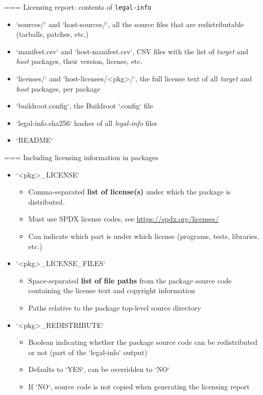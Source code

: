 === {Licensing report: contents of {\tt legal-info}}
  \begin{itemize}
  \item `sources/` and `host-sources/`, all the source files
    that are redistributable (tarballs, patches, etc.)
  \item `manifest.csv` and `host-manifest.csv`, CSV files
    with the list of {\em target} and {\em host} packages, their
    version, license, etc.
  \item `licenses/` and `host-licenses/<pkg>/`, the full license text of all {\em
      target} and {\em host} packages, per package
  \item `buildroot.config`, the Buildroot `.config` file
  \item `legal-info.sha256` hashes of all {\em legal-info} files
  \item `README`
  \end{itemize}


=== {Including licensing information in packages}
  \begin{itemize}
  \item `<pkg>_LICENSE`
    \begin{itemize}
    \item Comma-separated {\bf list of license(s)} under which the
      package is distributed.
    \item Must use SPDX license codes, see
      \url{https://spdx.org/licenses/}
    \item Can indicate which part is under which license (programs,
      tests, libraries, etc.)
    \end{itemize}
  \item `<pkg>_LICENSE_FILES`
    \begin{itemize}
    \item Space-separated {\bf list of file paths} from the package
      source code containing the license text and copyright
      information
    \item Paths relative to the package top-level source directory
    \end{itemize}
  \item `<pkg>_REDISTRIBUTE`
    \begin{itemize}
    \item Boolean indicating whether the package source code can be
      redistributed or not (part of the `legal-info` output)
    \item Defaults to `YES`, can be overridden to `NO`
    \item If `NO`, source code is not copied when generating the
      licensing report
    \end{itemize}
  \end{itemize}


